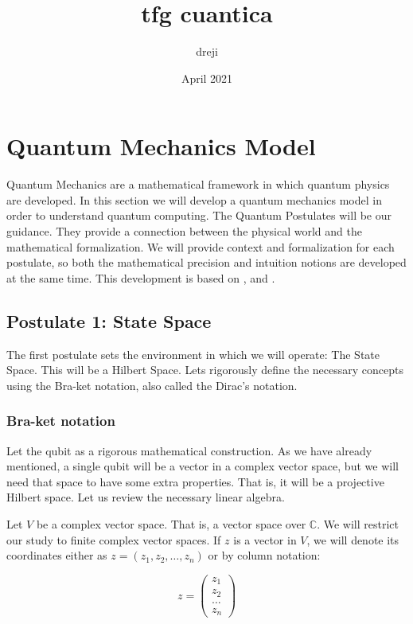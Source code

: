 \documentclass{article}
\title{tfg cuantica}
\author{dreji}
\date{April 2021}
\begin{document}
	
	
	\section{Quantum Mechanics Model}
	
	
	Quantum Mechanics are a mathematical framework in which quantum physics are developed. In this section we will develop a quantum mechanics model in order to understand quantum computing. The Quantum Postulates will be our guidance. They provide a connection between the physical world and the mathematical formalization. We will provide context and formalization for each postulate, so both the mathematical precision and intuition notions are developed at the same time. This development is based on \cite{Nielsen2002}, \cite{Manzano2020} and \cite{Bayens2019}.
	
	
	\subsection{Postulate 1: State Space}
	
	
	The first postulate sets the environment in which we will operate: The State Space. This will be a Hilbert Space. Lets rigorously define the necessary concepts using the Bra-ket notation, also called the Dirac's notation.
	
	
	\subsubsection{Bra-ket notation}
	
	
	Let the qubit as a rigorous mathematical construction. As we have already mentioned, a single qubit will be a vector in a complex vector space, but we will need that space to have some extra properties. That is, it will be a projective Hilbert space. Let us review the necessary linear algebra.
	
	Let $V$ be a complex vector space. That is, a vector space over $\mathds{C}$. We will restrict our study to finite complex vector spaces. If $z$ is a vector in $V$, we will denote its coordinates either as $z = (z_1, z_2, \dotsc, z_n)$ or by column notation:
	
	$$ z = 
	\begin{pmatrix}
		z_1\\
		z_2 \\
		\dotsc \\
		z_n
	\end{pmatrix}
	$$
	
\end{document}
